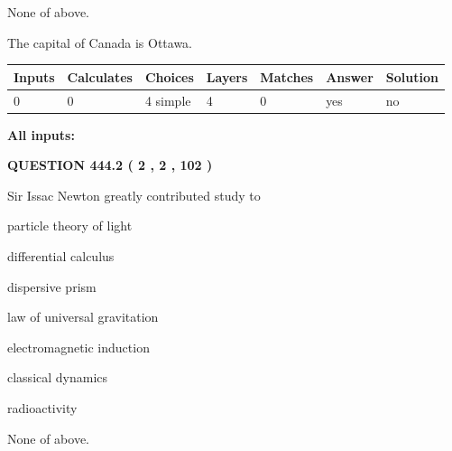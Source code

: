 \documentclass[12pt]{article}
\begin{document}
 
 None of above.
 
 
\noindent{}
 
 
The capital of Canada is Ottawa.
 
 
\noindent{}
 
 
   
   
   
   
\noindent\begin{tabular}{|l|l|l|l|l|l|l|}
 \hline
Inputs & Calculates & Choices & Layers & Matches & Answer & Solution \\ \hline
 0  & 
 0  & 
 4
  simple  
  & 
 4  & 
 0  & 
  yes & 
  no 
  \\ \hline
 \end{tabular}
   
   
   
   
\noindent{}
   
   
   
   
\noindent\vspace{0.1in}\hspace{-0.08in} {\textbf{\Large{All inputs: }}}
   
   
  
\vspace{0.2in}
  
{\textbf{\Large{QUESTION
444.2 
 ( 2 , 2 , 102 )
}}}
  
  
Sir Issac Newton greatly contributed study to
 
 
particle theory of light
 
 
differential calculus
 
 
dispersive prism
 
 
law of universal gravitation
 
 
electromagnetic induction
 
 
classical dynamics
 
 
radioactivity
 
 
 None of above.
 
\end{document}
